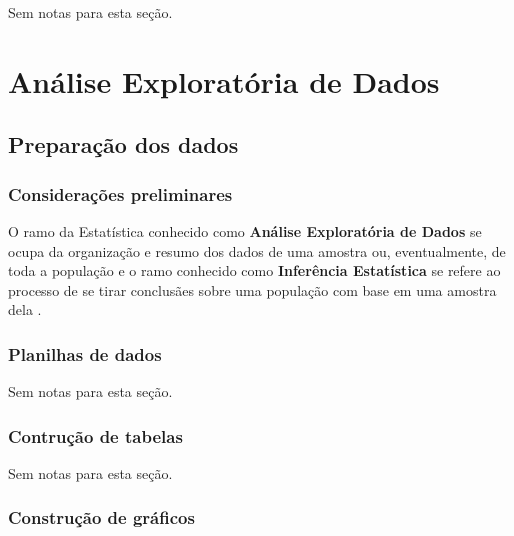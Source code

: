 \documentclass[
]{latex/krantz}
\renewenvironment{quote}{\begin{VF}}{\end{VF}}
\theoremstyle{definition}
\theoremstyle{definition}
\theoremstyle{definition}
\theoremstyle{definition}
\theoremstyle{remark}
\begin{document}
Sem notas para esta seção.

\hypertarget{part-anuxe1lise-exploratuxf3ria-de-dados}{%
\part{Análise Exploratória de Dados}\label{part-anuxe1lise-exploratuxf3ria-de-dados}}

\hypertarget{preparauxe7uxe3o-dos-dados}{%
\chapter{Preparação dos dados}\label{preparauxe7uxe3o-dos-dados}}

\hypertarget{considerauxe7uxf5es-preliminares}{%
\section{Considerações preliminares}\label{considerauxe7uxf5es-preliminares}}

\begin{quote}
O ramo da Estatística conhecido como \textbf{Análise Exploratória de Dados} se ocupa da organização e resumo dos dados de uma amostra ou, eventualmente, de toda a população e o ramo conhecido como \textbf{Inferência Estatística} se refere ao processo de se tirar conclusães sobre uma população com base em uma amostra dela \citep[p.~21]{MorettinSinger2022}.
\end{quote}

\hypertarget{planilhas-de-dados}{%
\section{Planilhas de dados}\label{planilhas-de-dados}}

Sem notas para esta seção.

\hypertarget{contruuxe7uxe3o-de-tabelas}{%
\section{Contrução de tabelas}\label{contruuxe7uxe3o-de-tabelas}}

Sem notas para esta seção.

\hypertarget{construuxe7uxe3o-de-gruxe1ficos}{%
\section{Construção de gráficos}\label{construuxe7uxe3o-de-gruxe1ficos}}
\end{document}
